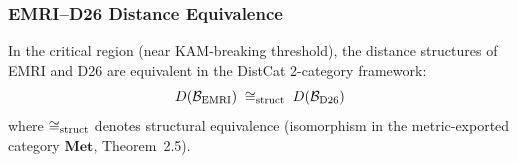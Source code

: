 \subsubsection{EMRI--D26 Distance Equivalence}\label{subsec:emri-d26-eq}

\begin{proposition}\label{prop:emri-d26-dist-eq}
In the critical region (near KAM-breaking threshold), the distance structures of EMRI and D26 are equivalent in the DistCat 2-category framework:
\begin{equation}
D(\mathcal{B}_{\rm EMRI}) \;\cong_{\rm struct}\; D(\mathcal{B}_{\rm D26})
\end{equation}
where $\cong_{\rm struct}$ denotes structural equivalence (isomorphism in the metric-exported category $\mathbf{Met}$, Theorem~2.5).
\end{proposition}

